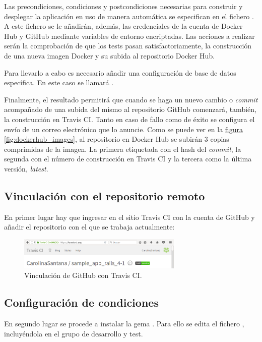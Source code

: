 Las precondiciones, condiciones y postcondiciones necesarias para construir y desplegar la aplicación en uso de manera automática se especifican en el fichero . A este fichero se le añadirán, además, las credenciales de la cuenta de Docker Hub y GitHub mediante variables de entorno encriptadas. Las acciones a realizar serán la comprobación de que los tests pasan satisfactoriamente, la construcción de una nueva imagen Docker y su subida al repositorio Docker Hub.

Para llevarlo a cabo es necesario añadir una configuración de base de datos específica. En este caso se llamará .

Finalmente, el resultado permitirá que cuando se haga un nuevo cambio o \textit{commit} acompañado de una subida del mismo al repositorio GitHub comenzará, también, la construcción en Travis CI. Tanto en caso de fallo como de éxito se configura el envío de un correo electrónico que lo anuncie. Como se puede ver en la \hyperref[fig:dockerhub_images]{figura \ref{fig:dockerhub_images}}, al repositorio en Docker Hub se subirán 3 copias comprimidas de la imagen. La primera etiquetada con el hash del \textit{commit}, la segunda con el número de construcción en Travis CI y la tercera como la última versión, \textit{latest}.

\subsection{Vinculación con el repositorio remoto}

En primer lugar hay que ingresar en el sitio Travis CI con la cuenta de GitHub y añadir el repositorio con el que se trabaja actualmente:

\begin{figure}[H]
\centering
\includegraphics[width=0.7\textwidth]{images/figures/travis_github.png}
\caption{Vinculación de GitHub con Travis CI.\label{fig:travis_github}}
\end{figure}

\subsection{Configuración de condiciones}

En segundo lugar se procede a instalar la gema . Para ello se edita el fichero , incluyéndola en el grupo de desarrollo y test.

